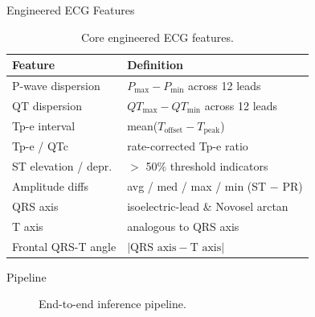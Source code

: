\documentclass[final]{beamer}
\newlength{\colwidth}
\begin{document}
\begin{frame}[t]
\begin{columns}[t]
\begin{column}{\colwidth}
\begin{block}{Engineered ECG Features}
    \begin{table}
      \centering
      \small
      \begin{tabular}{l l}
        \toprule
        \textbf{Feature} & \textbf{Definition} \\
        \midrule
        P-wave dispersion     & $P_{\max} - P_{\min}$ across 12 leads \\
        QT dispersion         & $QT_{\max} - QT_{\min}$ across 12 leads \\
        Tp-e interval         & mean($T_{\text{offset}} - T_{\text{peak}}$) \\
        Tp-e / QTc            & rate-corrected Tp-e ratio \\
        ST elevation / depr.  & $>$ 50\% threshold indicators \\
        Amplitude diffs       & avg / med / max / min (ST $-$ PR) \\
        QRS axis              & isoelectric-lead \& Novosel arctan \\
        T axis                & analogous to QRS axis \\
        Frontal QRS-T angle   & $|\text{QRS axis} - \text{T axis}|$ \\
        \bottomrule
      \end{tabular}
      \caption{Core engineered ECG features.}
    \end{table}

  \end{block}

  \begin{block}{Pipeline}

    \begin{figure}
      \centering
      \caption{End-to-end inference pipeline.}
    \end{figure}


\end{block}
\end{column}
\end{columns}
\end{frame}
\end{document}
